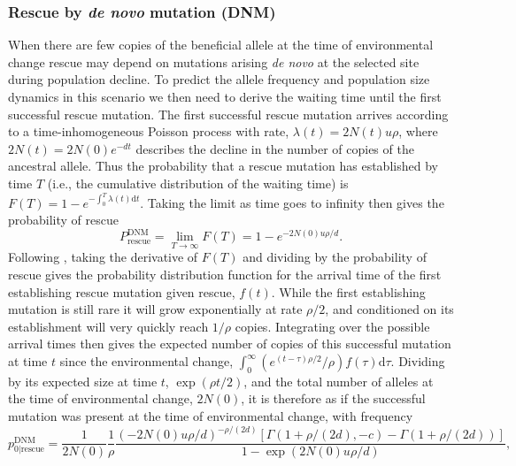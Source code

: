 \documentclass[]{article}
\begin{document}
\subsubsection*{Rescue by \textit{de novo} mutation (DNM)}
\label{sec:rescue_forward_DNM}

When there are few copies of the beneficial allele at the time of environmental change rescue may depend on mutations arising \textit{de novo} at the selected site during population decline.
To predict the allele frequency and population size dynamics in this scenario we then need to derive the waiting time until the first successful rescue mutation.
The first successful rescue mutation arrives according to a time-inhomogeneous Poisson process with rate, $\lambda(t) = 2 N(t) u \rho$, where $2N(t) = 2N(0) e^{-d t}$ describes the decline in the number of copies of the ancestral allele.
Thus the probability that a rescue mutation has established by time $T$ (i.e., the cumulative distribution of the waiting time) is $F(T) = 1-e^{-\int_0^T \lambda(t) \mathrm{d}t}$.
Taking the limit as time goes to infinity then gives the probability of rescue \citep[c.f., equation 10 in][]{orr2008population}
\begin{equation}
P_{\mathrm{rescue}}^{\mathrm{DNM}} = \lim_{T\rightarrow\infty} F(T) = 1 - e^{-2 N(0) u \rho / d}.
\end{equation}
Following \cite{orr2014population}, taking the derivative of $F(T)$ and dividing by the probability of rescue gives the probability distribution function for the arrival time of the first establishing rescue mutation given rescue, $f(t)$.
While the first establishing mutation is still rare it will grow exponentially at rate $\rho/2$, and conditioned on its establishment will very quickly reach $1/\rho$ copies. 
Integrating over the possible arrival times then gives the expected number of copies of this successful mutation at time $t$ since the environmental change, $\int_0^\infty (e^{(t-\tau) \rho/2} / \rho) f(\tau) \mathrm{d}\tau$.
Dividing by its expected size at time $t$, $\exp(\rho t/2)$, and the total number of alleles at the time of environmental change, $2N(0)$, it is therefore as if the successful mutation was present at the time of environmental change, with frequency
\begin{equation}\label{eq:p0dnm}
p_{0|\mathrm{rescue}}^{\mathrm{DNM}} = \frac{1}{2N(0)}\frac{1}{\rho}\frac{(-2N(0) u \rho/d)^{-\rho/(2d)} \left[\Gamma(1+\rho/(2d),-c) - \Gamma(1+\rho/(2d)) \right]}{1-\exp(2N(0) u \rho/d)},
\end{equation}
\end{document}
